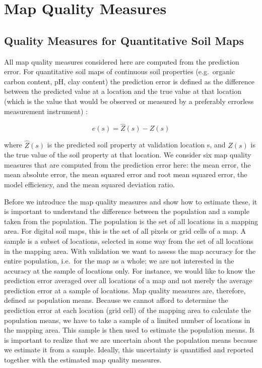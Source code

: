 \documentclass[10pt,b5paper,]{book}
\theoremstyle{definition}
\theoremstyle{definition}
\theoremstyle{definition}
\theoremstyle{remark}
\begin{document}
\hypertarget{map-quality-measures}{%
\section{Map Quality Measures}\label{map-quality-measures}}

\hypertarget{quality-measures-for-quantitative-soil-maps}{%
\subsection{Quality Measures for Quantitative Soil
Maps}\label{quality-measures-for-quantitative-soil-maps}}

All map quality measures considered here are computed from the
prediction error. For quantitative soil maps of continuous soil
properties (e.g.~organic carbon content, pH, clay content) the
prediction error is defined as the difference between the predicted
value at a location and the true value at that location (which is the
value that would be observed or measured by a preferably errorless
measurement instrument) \citep{brus2011sampling}:

\begin{equation}
e(s) = \hat{Z}(s) - Z(s)
\end{equation}

where \({\hat{Z}(s)}\) is the predicted soil property at validation
location s, and \({Z(s)}\) is the true value of the soil property at
that location. We consider six map quality measures that are computed
from the prediction error here: the mean error, the mean absolute error,
the mean squared error and root mean squared error, the model
efficiency, and the mean squared deviation ratio.

Before we introduce the map quality measures and show how to estimate
these, it is important to understand the difference between the
population and a sample taken from the population. The population is the
set of all locations in a mapping area. For digital soil maps, this is
the set of all pixels or grid cells of a map. A sample is a subset of
locations, selected in some way from the set of all locations in the
mapping area. With validation we want to assess the map accuracy for the
entire population, i.e.~for the map as a whole; we are not interested in
the accuracy at the sample of locations only. For instance, we would
like to know the prediction error averaged over all locations of a map
and not merely the average prediction error at a sample of locations.
Map quality measures are, therefore, defined as population means.
Because we cannot afford to determine the prediction error at each
location (grid cell) of the mapping area to calculate the population
means, we have to take a sample of a limited number of locations in the
mapping area. This sample is then used to estimate the population means.
It is important to realize that we are uncertain about the population
means because we estimate it from a sample. Ideally, this uncertainty is
quantified and reported together with the estimated map quality
measures.
\end{document}
